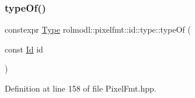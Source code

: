 \subsubsection{\texorpdfstring{typeOf()}{typeOf()}}
{\footnotesize\ttfamily constexpr \mbox{\hyperlink{namespacerolmodl_1_1pixelfmt_1_1id_acacda2442a2997fe425e2faa4e5d002b}{Type}} rolmodl\+::pixelfmt\+::id\+::type\+::type\+Of (\begin{DoxyParamCaption}\item[{const \mbox{\hyperlink{namespacerolmodl_1_1pixelfmt_a96282713e4465ba9211c8fd3a702b52b}{Id}}}]{id }\end{DoxyParamCaption})\hspace{0.3cm}{\ttfamily [noexcept]}}



Definition at line 158 of file Pixel\+Fmt.\+hpp.

